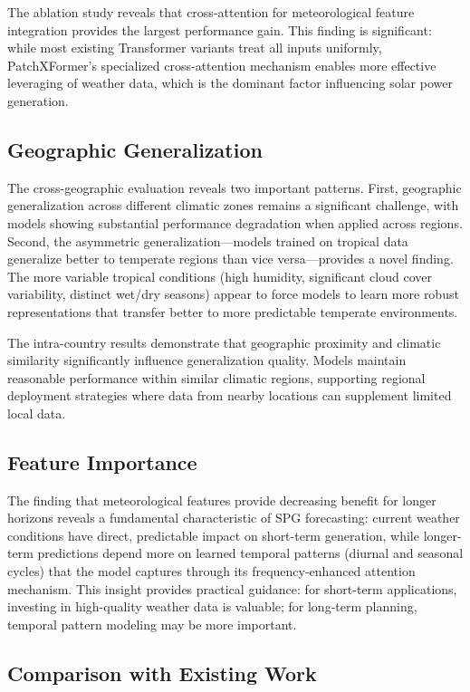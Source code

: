\documentclass[a4paper,fleqn]{cas-dc}
\begin{document}
The ablation study reveals that cross-attention for meteorological feature integration provides the largest performance gain. This finding is significant: while most existing Transformer variants treat all inputs uniformly, PatchXFormer's specialized cross-attention mechanism enables more effective leveraging of weather data, which is the dominant factor influencing solar power generation.

\subsection{Geographic Generalization}

The cross-geographic evaluation reveals two important patterns. First, geographic generalization across different climatic zones remains a significant challenge, with models showing substantial performance degradation when applied across regions. Second, the asymmetric generalization---models trained on tropical data generalize better to temperate regions than vice versa---provides a novel finding. The more variable tropical conditions (high humidity, significant cloud cover variability, distinct wet/dry seasons) appear to force models to learn more robust representations that transfer better to more predictable temperate environments.

The intra-country results demonstrate that geographic proximity and climatic similarity significantly influence generalization quality. Models maintain reasonable performance within similar climatic regions, supporting regional deployment strategies where data from nearby locations can supplement limited local data.

\subsection{Feature Importance}

The finding that meteorological features provide decreasing benefit for longer horizons reveals a fundamental characteristic of SPG forecasting: current weather conditions have direct, predictable impact on short-term generation, while longer-term predictions depend more on learned temporal patterns (diurnal and seasonal cycles) that the model captures through its frequency-enhanced attention mechanism. This insight provides practical guidance: for short-term applications, investing in high-quality weather data is valuable; for long-term planning, temporal pattern modeling may be more important.

\subsection{Comparison with Existing Work}
\end{document}
